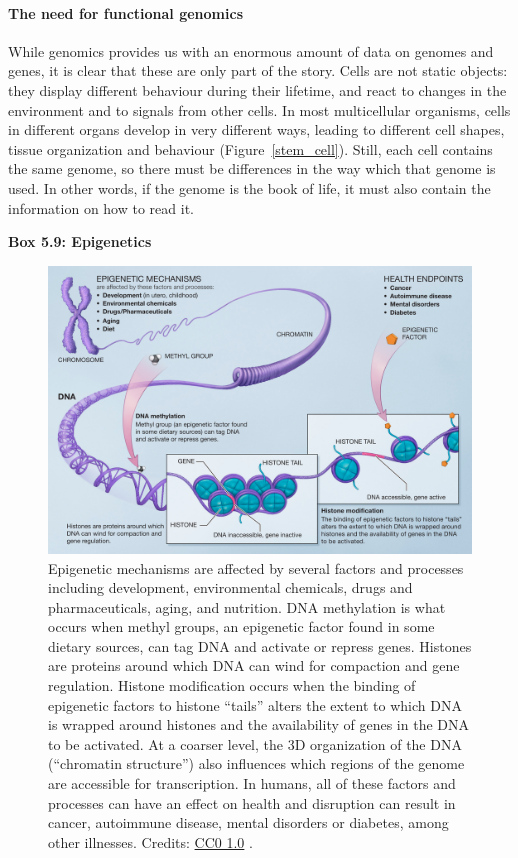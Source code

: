 \paragraph{The need for functional genomics}

While genomics provides us with an enormous amount of data on genomes and
genes, it is clear that these are only part of the story. Cells are not
static objects: they display different behaviour during their lifetime, and
react to changes in the environment and to signals from other cells. In
most multicellular organisms, cells in different organs develop in very
different ways, leading to different cell shapes, tissue organization and
behaviour (Figure~\ref{stem_cell}). Still, each cell contains the same genome, so there must be
differences in the way which that genome is used. In other words, if the genome is
the book of life, it must also contain the information on how to read it.

\begin{framed}
\textbf{Box 5.9: Epigenetics}\\
\begin{figure}[!htbp]
\centering
\includegraphics[width=1\linewidth]{files/epigenetics-30bb0bad64f2ca2bdc32b0b29f7ce6a8.png}
\caption[]{Epigenetic mechanisms are affected by several factors and processes
including development, environmental chemicals, drugs and pharmaceuticals,
aging, and nutrition. DNA methylation is what occurs when methyl groups, an
epigenetic factor found in some dietary sources, can tag DNA and activate or
repress genes. Histones are proteins around which DNA can wind for
compaction and gene regulation. Histone modification occurs when the
binding of epigenetic factors to histone ``tails'' alters the extent to which
DNA is wrapped around histones and the availability of genes in the DNA to
be activated. At a coarser level, the 3D organization of the DNA (``chromatin
structure'') also influences which regions of the genome are accessible for
transcription. In humans, all of these factors and processes can have an effect on
health and disruption can result in cancer,
autoimmune disease, mental disorders or diabetes, among other illnesses.
Credits: \href{https://creativecommons.org/publicdomain/zero/1.0/}{CC0 1.0} \cite{epigenetics_2005}.}
\label{epigenetics}
\end{figure}
\end{framed}

